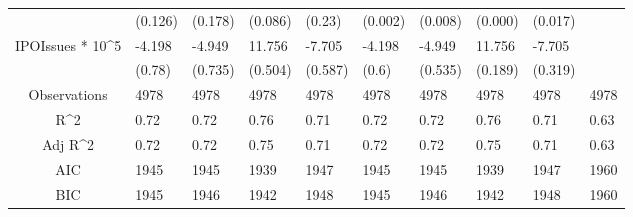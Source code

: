 \documentclass{article}
\begin{document}
\begin{table}[H]
\begin{tabular}{|clllllllll|}
   & (0.126) & (0.178) & (0.086) & (0.23) & (0.002) & (0.008) & (0.000) & (0.017) &  \\ 
  IPOIssues * 10^5 & -4.198 & -4.949 & 11.756 & -7.705 & -4.198 & -4.949 & 11.756 & -7.705 &  \\ 
   & (0.78) & (0.735) & (0.504) & (0.587) & (0.6) & (0.535) & (0.189) & (0.319) &  \\ 
  \hline 
 Observations & 4978 & 4978 & 4978 & 4978 & 4978 & 4978 & 4978 & 4978 & 4978 \\ 
  R^2 & 0.72 & 0.72 & 0.76 & 0.71 & 0.72 & 0.72 & 0.76 & 0.71 & 0.63 \\ 
  Adj R^2 & 0.72 & 0.72 & 0.75 & 0.71 & 0.72 & 0.72 & 0.75 & 0.71 & 0.63 \\ 
  AIC & 1945 & 1945 & 1939 & 1947 & 1945 & 1945 & 1939 & 1947 & 1960 \\ 
  BIC & 1945 & 1946 & 1942 & 1948 & 1945 & 1946 & 1942 & 1948 & 1960 \\ 
   \hline
\end{tabular}
 
\end{table}
\end{document}
